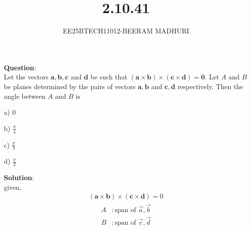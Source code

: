 \documentclass[journal]{IEEEtran}
\begin{document}

\vspace{3cm}

\title{2.10.41}
\author{EE25BTECH11012-BEERAM MADHURI}
{\let\newpage\relax\maketitle}

\renewcommand{\thefigure}{\theenumi}
\renewcommand{\thetable}{\theenumi}
\setlength{\intextsep}{10pt} %


\renewcommand{\thetable}{\theenumi}


\textbf{Question}:\\
Let the vectors $\mathbf{a}, \mathbf{b}, \mathbf{c}$ and $\mathbf{d}$ be such that $(\mathbf{a} \times \mathbf{b}) \times (\mathbf{c} \times \mathbf{d}) = \mathbf{0}$. Let $A$ and $B$ be planes determined by the pairs of vectors $\mathbf{a}, \mathbf{b}$ and $\mathbf{c}, \mathbf{d}$ respectively. Then the angle between $A$ and $B$ is

\begin{enumerate}
\begin{multicols}{4}
\item[a)] $0$
\item[b)] $\frac{\pi}{4}$
\item[c)] $\frac{\pi}{3}$
\item[d)] $\frac{\pi}{2}$
\end{multicols}
\end{enumerate}
\textbf{Solution}:\\
given, 
\begin{align}
(\mathbf{a} \times \mathbf{b}) \times (\mathbf{c} \times \mathbf{d}) = 0
\end{align}
\begin{align*}
A &: \text{span of } \vec{a}, \vec{b} \\
B &: \text{span of } \vec{c}, \vec{d}
\end{align*}
\end{document}
